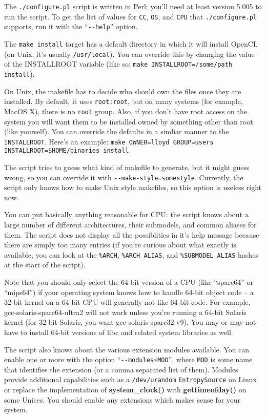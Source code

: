 \documentclass{article}
\newcommand{\filename}[1]{\texttt{#1}}
\newcommand{\function}[1]{\textbf{#1}}
\newcommand{\type}[1]{\texttt{#1}}
\begin{document}
The \filename{./configure.pl} script is written in Perl; you'll need at least
version 5.005 to run the script. To get the list of values for \verb|CC|,
\verb|OS|, and \verb|CPU| that \filename{./configure.pl} supports, run it with
the ``\verb|--help|'' option.

The \verb|make install| target has a default directory in which it will install
OpenCL (on Unix, it's usually \verb|/usr/local|). You can override this by
changing the value of the INSTALLROOT variable (like so:
\verb|make INSTALLROOT=/some/path install|).

On Unix, the makefile has to decide who should own the files once they are
installed. By default, it uses \texttt{root:root}, but on many systems (for
example, MacOS X), there is no \texttt{root} group. Also, if you don't have
root access on the system you will want them to be installed owned by something
other than root (like yourself). You can override the defaults in a simliar
manner to the \texttt{INSTALLROOT}. Here's an example:
\verb|make OWNER=lloyd GROUP=users INSTALLROOT=$HOME/binaries install|

The script tries to guess what kind of makefile to generate, but it might guess
wrong, so you can override it with \verb|--make-style=somestyle|. Currently,
the script only knows how to make Unix style makefiles, so this option is
useless right now.

You can put basically anything reasonable for CPU: the script knows about a
large number of different architectures, their submodels, and common aliases
for them. The script does not display all the possiblities in it's help message
because there are simply too many entries (if you're curious about what exactly
is available, you can look at the \verb|%ARCH|, \verb|%ARCH_ALIAS|, and
\verb|%SUBMODEL_ALIAS| hashes at the start of the script).

Note that you should only select the 64-bit version of a CPU (like ``sparc64''
or ``mips64'') if your operating system knows how to handle 64-bit object code
-- a 32-bit kernel on a 64-bit CPU will generally not like 64-bit code. For
example, gcc-solaris-sparc64-ultra2 will not work unless you're running a
64-bit Solaris kernel (for 32-bit Solaris, you want gcc-solaris-sparc32-v9).
You may or may not have to install 64-bit versions of libc and related system
libraries as well.

The script also knows about the various extension modules available. You can
enable one or more with the option ``\verb|--modules=MOD|'', where \verb|MOD|
is some name that identifies the extension (or a comma separated list of them).
Modules provide additional capabilities such as a \filename{/dev/urandom}
\type{EntropySource} on Linux or replace the implementation of
\function{system\_clock()} with \function{gettimeofday()} on some Unices. You
should enable any extensions which makes sense for your system.
\end{document}
